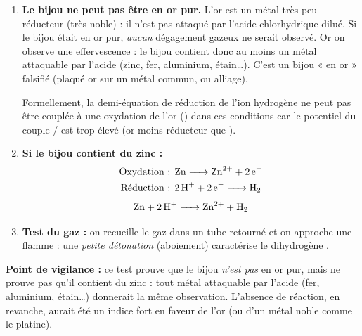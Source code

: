 \documentclass[11pt]{article}
\begin{document}
\begin{corrige}
\begin{enumerate}
\item \textbf{Le bijou ne peut pas être en or pur.} L'or est un métal très peu réducteur (très noble) : il n'est pas attaqué par l'acide chlorhydrique dilué. Si le bijou était en or pur, \emph{aucun} dégagement gazeux ne serait observé. Or on observe une effervescence : le bijou contient donc au moins un métal attaquable par l'acide (zinc, fer, aluminium, étain\dots). C'est un bijou « en or » falsifié (plaqué or sur un métal commun, ou alliage).

Formellement, la demi-équation de réduction de l'ion hydrogène  ne peut pas être couplée à une oxydation de l'or () dans ces conditions car le potentiel du couple / est trop élevé (or moins réducteur que ).

\item \textbf{Si le bijou contient du zinc :}
\begin{align*}
\text{Oxydation : } & \ce{Zn -> Zn^2+ + 2e-} \\
\text{Réduction : } & \ce{2H+ + 2e- -> H2}
\end{align*}
\[ \ce{Zn + 2H+ -> Zn^2+ + H2} \]

\item \textbf{Test du gaz :} on recueille le gaz dans un tube retourné et on approche une flamme : une \emph{petite détonation} (aboiement) caractérise le dihydrogène .
\end{enumerate}

\textbf{Point de vigilance :} ce test prouve que le bijou \emph{n'est pas} en or pur, mais ne prouve pas qu'il contient du zinc : tout métal attaquable par l'acide (fer, aluminium, étain\dots) donnerait la même observation. L'absence de réaction, en revanche, aurait été un indice fort en faveur de l'or (ou d'un métal noble comme le platine).
\end{corrige}
\end{document}
